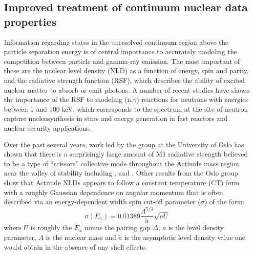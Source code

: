 \documentclass[letterpaper]{ar-1col}
\newcommand{\pp}[1]{\left( #1\right)}
\begin{document}
\subsection{Improved treatment of continuum nuclear data properties}
\label{sec:LD_RSF}

Information regarding states in the unresolved continuum region above the particle separation energy is of central importance to accurately modeling the competition between particle and gamma-ray emission.
 The most important of these are the nuclear level density (NLD) as a function of energy, spin and parity, and the radiative strength function (RSF), which describes the ability of excited nuclear matter to absorb or emit photons.
 A number of recent studies have shown the importance of the RSF to modeling (n,$\gamma$) reactions for neutrons with energies between 1 and 100 keV, which corresponds to the spectrum at the site of neutron capture nucleosynthesis in stars \cite{PhysRevC.82.014318, Lar15} and energy generation in fast reactors and nuclear security applications.
  
Over the past several years, work led by the group at the University of Oslo has shown that there is a surprisingly large amount of M1 radiative strength believed to be a type of \enquote{scissors} collective mode throughout the Actinide mass region near the valley of stability including ,  and  \cite{Lap16, Gut13, Gut13a, Gut14, Gut15}.
Other results from the Oslo group show that Actinide NLDs appears to follow a constant temperature (CT) form with a roughly Gaussian dependence on angular momentum that is often described via an energy-dependent width spin cut-off parameter ($\sigma$) of the form: 
\begin{equation}\label{eqn:spin_cutoff}
\sigma\pp{E_x}=0.01389 \dfrac{A^{5/3}}{\widetilde{a}}\sqrt{aU}
\end{equation}
where $U$ is roughly the $E_x$ minus the pairing gap $\Delta$, $a$ is the level density parameter, $A$ is the nuclear mass and $\widetilde{a}$ is the asymptotic level density value one would obtain in the absence of any shell effects.
\end{document}
